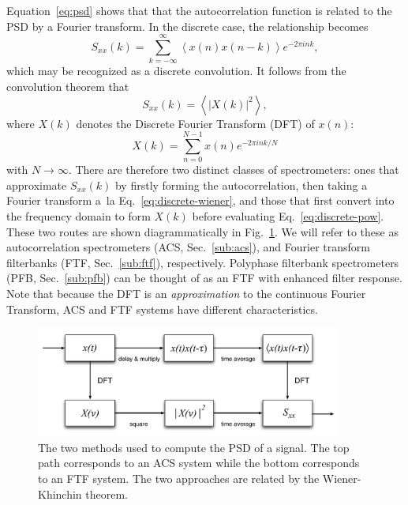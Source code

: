 \documentclass{ws-rv961x669}
\begin{document}
Equation~\ref{eq:psd} shows that that the autocorrelation function is related to the PSD by a Fourier transform. In the discrete case, the relationship becomes
\begin{equation}
S_{xx}(k)=\sum_{k=-\infty}^{\infty}\left\langle x(n)x(n-k)\right\rangle e^{-2\pi ink},\label{eq:discrete-wiener}
\end{equation}
which may be recognized as a discrete convolution. It follows from the convolution theorem that 
\begin{equation}
S_{xx}(k)=\left\langle \left|X(k)\right|^{2}\right\rangle ,\label{eq:discrete-pow}
\end{equation}
where $X(k)$ denotes the Discrete Fourier Transform (DFT) of $x(n)$:
\begin{equation}
X(k)=\sum_{n=0}^{N-1}x(n)e^{-2\pi ink/N}\label{eq:dft1}
\end{equation}
with $N \rightarrow \infty$. There are therefore two distinct classes of spectrometers: ones that approximate $S_{xx}(k)$ by firstly forming the autocorrelation, then taking a Fourier transform a~la Eq.~\ref{eq:discrete-wiener}, and those that first convert into the frequency domain to form $X(k)$ before evaluating Eq.~\ref{eq:discrete-pow}. These two routes are shown diagrammatically in Fig.~\ref{fig:wiener}. We will refer to these as autocorrelation spectrometers (ACS, Sec.~\ref{sub:acs}), and Fourier transform filterbanks (FTF, Sec.~\ref{sub:ftf}), respectively. Polyphase filterbank spectrometers (PFB, Sec.~\ref{sub:pfb}) can be thought of as an  FTF with enhanced filter response. Note that because the DFT is an \emph{approximation} to the continuous Fourier Transform, ACS and FTF systems have different characteristics. 

\begin{figure}[t]
 \centering
 \includegraphics[width=0.9\textwidth]{./figures/wiener}
 \caption{The two methods used to compute the PSD of a signal. The top path corresponds to an ACS system while the bottom corresponds to an FTF system. The two approaches are related by the Wiener-Khinchin theorem. \label{fig:wiener}  }
\end{figure}
\end{document}
